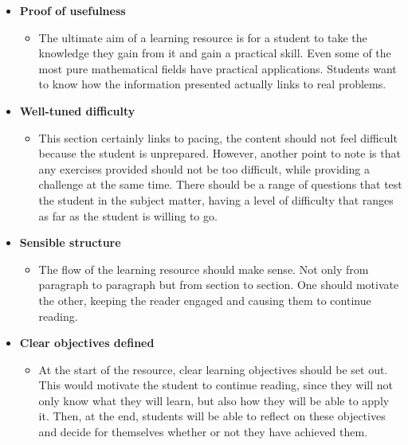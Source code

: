 \begin{itemize}
\begin{itemize}
        \end{itemize}
    \item \textbf{Proof of usefulness}
        \begin{itemize}
            \item The ultimate aim of a learning resource is for a student to take the knowledge they gain from it and gain a practical skill. Even some of the most pure mathematical fields have practical applications. Students want to know how the information presented actually links to real problems. \cite{times-higher-education}
        \end{itemize}
    \item \textbf{Well-tuned difficulty}
        \begin{itemize}
            \item This section certainly links to pacing, the content should not feel difficult because the student is unprepared. However, another point to note is that any exercises provided should not be too difficult, while providing a challenge at the same time. There should be a range of questions that test the student in the subject matter, having a level of difficulty that ranges as far as the student is willing to go.
        \end{itemize}
    \item \textbf{Sensible structure}
        \begin{itemize}
            \item The flow of the learning resource should make sense. Not only from paragraph to paragraph but from section to section. One should motivate the other, keeping the reader engaged and causing them to continue reading.
        \end{itemize}
    \item \textbf{Clear objectives defined}
        \begin{itemize}
            \item At the start of the resource, clear learning objectives should be set out. This would motivate the student to continue reading, since they will not only know what they will learn, but also how they will be able to apply it. Then, at the end, students will be able to reflect on these objectives and decide for themselves whether or not they have achieved them.
        \end{itemize}
\end{itemize}


